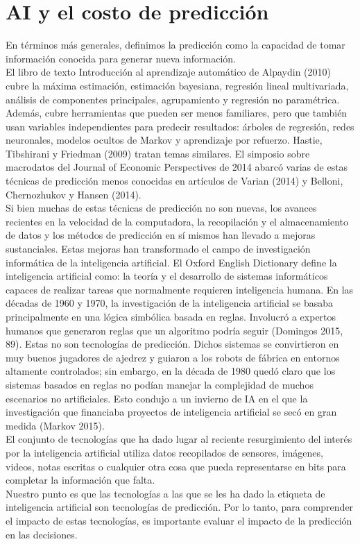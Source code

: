 \section{AI y el costo de predicción}
En términos más generales, definimos la predicción como la capacidad de tomar información conocida para generar nueva información. \\
El libro de texto Introducción al aprendizaje automático de Alpaydin (2010) cubre la máxima estimación, estimación bayesiana, regresión lineal multivariada, análisis de componentes principales, agrupamiento y regresión no paramétrica. Además, cubre herramientas que pueden ser menos familiares, pero que también usan variables independientes para predecir resultados: árboles de regresión, redes neuronales, modelos ocultos de Markov y aprendizaje por refuerzo. Hastie, Tibshirani y Friedman (2009) tratan temas similares. El simposio sobre macrodatos del Journal of Economic Perspectives de 2014 abarcó varias de estas técnicas de predicción menos conocidas en artículos de Varian (2014) y Belloni, Chernozhukov y Hansen (2014).\\
Si bien muchas de estas técnicas de predicción no son nuevas, los avances recientes en la velocidad de la computadora, la recopilación y el almacenamiento de datos y los métodos de predicción en sí mismos han llevado a mejoras sustanciales. Estas mejoras han transformado el campo de investigación informática de la inteligencia artificial. El Oxford English Dictionary define la inteligencia artificial como: la teoría y el desarrollo de sistemas informáticos capaces de realizar tareas que normalmente requieren inteligencia humana. En las décadas de 1960 y 1970, la investigación de la inteligencia artificial se basaba principalmente en una lógica simbólica basada en reglas. Involucró a expertos humanos que generaron reglas que un algoritmo podría seguir (Domingos 2015, 89). Estas no son tecnologías de predicción. Dichos sistemas se convirtieron en muy buenos jugadores de ajedrez y guiaron a los robots de fábrica en entornos altamente controlados; sin embargo, en la década de 1980 quedó claro que los sistemas basados en reglas no podían manejar la complejidad de muchos escenarios no artificiales. Esto condujo a un invierno de IA en el que la investigación que financiaba proyectos de inteligencia artificial se secó en gran medida (Markov 2015).\\
El conjunto de tecnologías que ha dado lugar al reciente resurgimiento del interés por la inteligencia artificial utiliza datos recopilados de sensores, imágenes, videos, notas escritas o cualquier otra cosa que pueda representarse en bits para completar la información que falta.\\
Nuestro punto es que las tecnologías a las que se les ha dado la etiqueta de inteligencia artificial son tecnologías de predicción. Por lo tanto, para comprender el impacto de estas tecnologías, es importante evaluar el impacto de la predicción en las decisiones.

